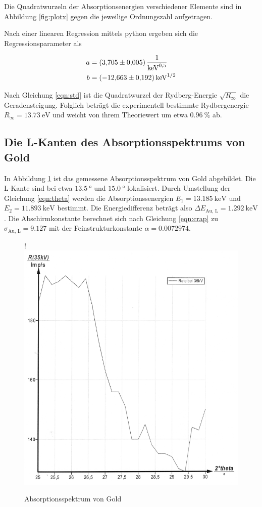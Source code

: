 Die Quadratwurzeln der Absorptionsenergien verschiedener Elemente
sind in Abbildung \ref{fig:plotx} gegen die jeweilige Ordnungszahl aufgetragen.

Nach einer linearen Regression mittels python ergeben sich die
Regressionsparameter als

\begin{align*}
  a &= \SI{3.705 +- 0.005}{\per \kilo \eV \tothe{1/2}} \\
  b &= \SI{-12.663 +- 0.192}{\kilo \eV \tothe{1/2}}
\end{align*}

Nach Gleichung \eqref{eqn:std} ist die Quadratwurzel der Rydberg-Energie
$\sqrt{R_\infty}$ die Geradensteigung. Folglich beträgt die experimentell
bestimmte Rydbergenergie $R_\infty = \SI{13.73}{\eV}$ und weicht von ihrem
Theoriewert um etwa $\SI{0.96}{\percent}$ ab.

\subsection{Die L-Kanten des Absorptionsspektrums von Gold}

In Abbildung \ref{fig:plot7} ist das gemessene Absorptionsspektrum von Gold abgebildet.
Die L-Kante sind bei etwa $\SI{13.5}{\degree}$ und $\SI{15.0}{\degree}$ lokalisiert.
Durch Umstellung der Gleichung \eqref{eqn:theta} werden die Absorptionssenergien 
$ E_1 = \SI{13.185}{\kilo\eV}$ und $ E_2 = \SI{11.893}{\kilo\eV}$ bestimmt.
Die Energiedifferenz beträgt also $\Delta E_\text{Au, L} = \SI{1.292}{\kilo\eV}$.
Die Abschirmkonstante berechnet sich nach Gleichung \eqref{eqn:crap} zu 
$\sigma_\text{Au, L} = 9.127$ mit der Feinstrukturkonstante
$\alpha = 0.0072974$.

\begin{figure}[H]!
  \centering
  \includegraphics[scale=0.3]{content/bild3.png}
  \caption{Absorptionsspektrum von Gold}
  \label{fig:plot7}
\end{figure}







